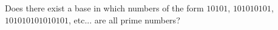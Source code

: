 \documentclass[varwidth]{standalone}
\begin{document}
    Does there exist a base in which numbers of the form $10101$, $101010101$, $101010101010101$, etc... are all prime numbers?
\end{document}
